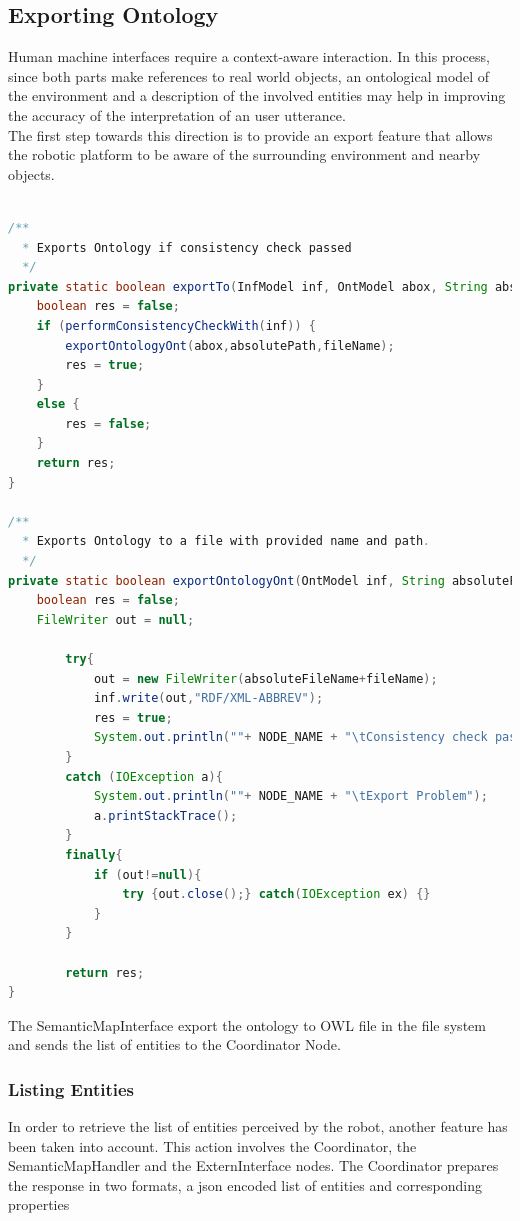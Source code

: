 \subsection{Exporting Ontology}
Human machine interfaces require a context-aware interaction. In this process, since both parts make references to real world objects, an ontological model of the environment and a description of the involved entities may help in improving the accuracy of the interpretation of an user utterance.\\
The first step towards this direction is to provide an export feature that allows the robotic platform to be aware of the surrounding environment and nearby objects.\\
\\

\begin{lstlisting}[language=Java]
/** 
  * Exports Ontology if consistency check passed
  */
private static boolean exportTo(InfModel inf, OntModel abox, String absolutePath, String fileName){
	boolean res = false;
	if (performConsistencyCheckWith(inf)) {
		exportOntologyOnt(abox,absolutePath,fileName);
		res = true;
	}
	else {
		res = false;
	}
	return res;
}

/** 
  * Exports Ontology to a file with provided name and path.
  */
private static boolean exportOntologyOnt(OntModel inf, String absoluteFileName, String fileName){
	boolean res = false;
    FileWriter out = null;

    	try{
    		out = new FileWriter(absoluteFileName+fileName);
    		inf.write(out,"RDF/XML-ABBREV");
    		res = true;
	    	System.out.println(""+ NODE_NAME + "\tConsistency check passed. Writing to file:\t"+fileName);
    	}
    	catch (IOException a){
    		System.out.println(""+ NODE_NAME + "\tExport Problem");
            a.printStackTrace();
    	}
    	finally{
    		if (out!=null){
    			try {out.close();} catch(IOException ex) {}
    		}
    	}

    	return res;
}
\end{lstlisting}

The SemanticMapInterface export the ontology to OWL file in the file system and sends the list of entities to the Coordinator Node.

\subsubsection*{Listing Entities}
\label{subsubsec:list}
In order to retrieve the list of entities perceived by the robot, another feature has been taken into account. This action involves the Coordinator, the SemanticMapHandler and the ExternInterface nodes. The Coordinator prepares the response in two formats, a json encoded list of entities and corresponding properties

